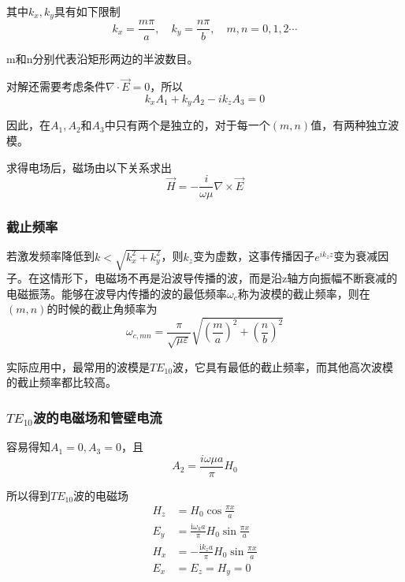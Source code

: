 \documentclass[UTF8]{ctexart}
\begin{document}
\noindent 其中$k_x,k_y$具有如下限制
\begin{equation}
    k_x = \frac{m \pi }{a}, \quad k_y= \frac{n \pi }{b}, \quad m,n=0,1,2 \cdots 
\end{equation}

\noindent m和n分别代表沿矩形两边的半波数目。

    对解还需要考虑条件$\nabla \cdot \vec{E} = 0$，所以
    \begin{equation}
        k_x A_1 + k_y A_2 - i k_z A_3 = 0
    \end{equation}

\noindent 因此，在$A_1,A_2$和$A_3$中只有两个是独立的，对于每一个$(m,n)$值，有两种独立波模。

    求得电场后，磁场由以下关系求出
    \begin{equation}
        \vec{H} = - \frac{i}{\omega \mu} \nabla \times \vec{E}
    \end{equation}

    \subsubsection{截止频率}
    若激发频率降低到$k< \sqrt{k_x^2 + k_y^2}$，则$k_z$变为虚数，这事传播因子$e^{i k_z z}$变为衰减因子。在这情形下，电磁场不再是沿波导传播的波，而是沿z轴方向振幅不断衰减的电磁振荡。能够在波导内传播的波的最低频率$\omega_c$称为波模的截止频率，则在$(m,n)$的时候的截止角频率为
    \begin{equation}
        \omega_{c,mn}= \frac{\pi}{\sqrt{\mu \varepsilon}} \sqrt{\left(\frac{m}{a}\right)^2 + \left(\frac{n}{b}\right)^2}
    \end{equation}

    实际应用中，最常用的波模是$TE_{10}$波，它具有最低的截止频率，而其他高次波模的截止频率都比较高。

    \subsubsection{\texorpdfstring{$TE_{10}$}{Lg}波的电磁场和管壁电流}
    容易得知$A_1=0, A_3=0$，且
    \begin{equation}
        A_2 = \frac{i \omega \mu a}{\pi} H_0
    \end{equation}

\noindent 所以得到$TE_{10}$波的电磁场 
\begin{equation}
\begin{aligned}H_{z}&=H_{0} \cos \frac{\pi x}{a} \\ E_{y}&=\frac{\mathrm{i} \omega_{k} a}{\pi} H_{0} \sin \frac{\pi x}{a} \\ H_{x}&=-\frac{\mathrm{i} k_{z} a}{\pi} H_{0} \sin \frac{\pi x}{a} \\ E_{x}&=E_{z}=H_{y}=0\end{aligned}
\end{equation}
\end{document}
